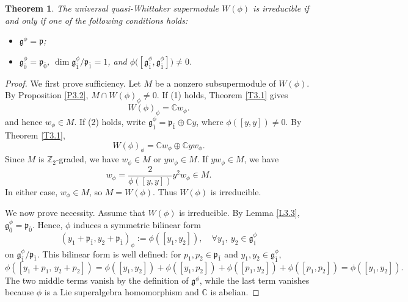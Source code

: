 \documentclass[12pt,reqno]{article}
\newtheorem{thm}{Theorem}[section]
\def\o{\overline}
\def\F{\mathfrak}
\def\CC{\mathbb{C}}
\def\ZZ{\mathbb{Z}}
\def\beqn{\begin{equation*}}
\def\eeqn{\end{equation*}}
\def\({\left(}
\def\){\right)}
\begin{document}
\begin{thm}\label{T3.4}
The universal quasi-Whittaker supermodule $W(\phi)$ is irreducible if and only if one of the following conditions holds:
\begin{itemize}
\item[(1)] $\F{g}^\phi=\F{p}$;
\item[(2)] $\F{g}_{\o{0}}^\phi=\F{p}_{\o{0}}$, $\dim\F{g}_{\o{1}}^\phi/\F{p}_{\o{1}}=1$, and $\phi\bigl([\F{g}_{\o{1}}^\phi,\F{g}_{\o{1}}^\phi]\bigr)\neq0$.
\end{itemize}
\end{thm}

\begin{proof}
We first prove sufficiency. Let $M$ be a nonzero subsupermodule of $W(\phi)$. By Proposition \ref{P3.2}, $M\cap W(\phi)_\phi\neq0$. If (1) holds, Theorem \ref{T3.1} gives
\beqn
W(\phi)_\phi=\CC w_{\phi}.
\eeqn
and hence $w_\phi\in M$. If (2) holds, write $\F{g}^\phi_{\o{1}}=\F{p}_{\o{1}}\oplus\CC y$, where $\phi([y,y])\neq0$. By Theorem \ref{T3.1},
 \beqn
 W(\phi)_\phi=\CC w_{\phi}\oplus\CC yw_{\phi}.  
 \eeqn
 Since $M$ is $\ZZ_2$-graded, we have $w_{\phi}\in M$ or $yw_{\phi}\in M$. If $yw_{\phi}\in M$, we have
 \beqn
 w_{\phi}=\frac{2}{\phi([y,y])}y^2w_{\phi}\in M.
 \eeqn
In either case, $w_{\phi}\in M$, so $M=W(\phi)$. Thus $W(\phi)$ is irreducible.
 
We now prove necessity. Assume that $W(\phi)$ is irreducible. By Lemma \ref{L3.3}, $\F{g}^\phi_{\o{0}}=\F{p}_{\o{0}}$. Hence, $\phi$ induces a symmetric bilinear form
 \beqn
 (y_1+\F{p}_{\o{1}},y_2+\F{p}_{\o{1}})_\phi:=\phi([y_1,y_2]),\quad \forall y_1,~y_2\in \F{g}^{\phi}_{\o{1}}
 \eeqn
 on $\F{g}^{\phi}_{\o{1}}/\F{p}_{\o{1}}$.
This bilinear form is well defined: for $p_1,p_2\in\F{p}_{\o{1}}$ and $y_1,y_2\in\F{g}_{\o{1}}^\phi$,
\beqn
\phi\([y_1 + p_1,\, y_2 + p_2]\)
= \phi\([y_1,y_2]\) + \phi\([y_1,p_2]\) + \phi\([p_1,y_2]\) + \phi\([p_1,p_2]\)=\phi\([y_1,y_2]\).
\eeqn
The two middle terms vanish by the definition of $\F{g}^\phi$, while the last term vanishes because $\phi$ is a Lie superalgebra homomorphism and $\CC$ is abelian.



\end{proof}
\end{document}
